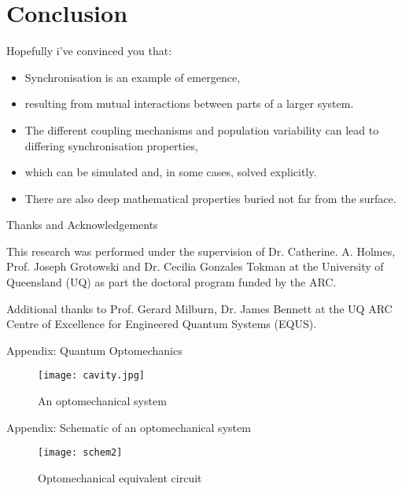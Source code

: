 \documentclass[10pt,reqno]{beamer}
\begin{document}
\section{Conclusion}
\begin{frame}
Hopefully i've convinced you that:
\begin{itemize}
	\item Synchronisation is an example of emergence,
	\item resulting from mutual interactions between parts of a larger system.
	\item The different coupling mechanisms and population variability can lead to differing synchronisation properties,
	\item which can be simulated and, in some cases, solved explicitly.
	\item There are also deep mathematical properties buried not far from the surface.
\end{itemize}
\end{frame}
\begin{frame}{Thanks and Acknowledgements}


This research was performed under the supervision of Dr. Catherine. A. Holmes, Prof. Joseph Grotowski and Dr. Cecilia Gonzales Tokman at the University of Queensland (UQ) as part the doctoral program funded by the ARC.
\vspace{12pt}

Additional thanks to Prof. Gerard Milburn, Dr. James Bennett at the UQ ARC Centre of Excellence for Engineered Quantum Systems (EQUS).
\end{frame}
\begin{frame}{Appendix: Quantum Optomechanics}
\begin{figure}
\texttt{[image: cavity.jpg]}\caption{An optomechanical system~\cite{nanoimg}}
\end{figure}
\end{frame}
\begin{frame}{Appendix: Schematic of an optomechanical system}
\begin{figure}
	\texttt{[image: schem2]}\caption{Optomechanical equivalent circuit}
\end{figure}
\end{frame}

{\tiny
\printbibliography}
\end{document}
